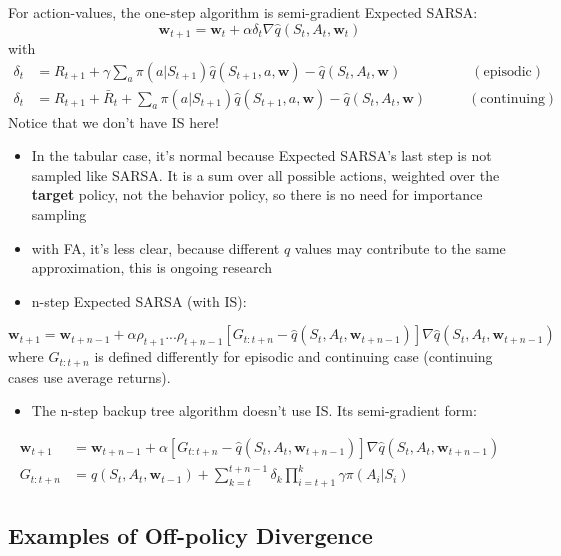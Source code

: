 \documentclass[sutton_barto_notes.tex]{subfiles}
\begin{document}
For action-values, the one-step algorithm is semi-gradient Expected SARSA:
$$ \mathbf{w}_{t+1} = \mathbf{w}_t + \alpha \delta_t \nabla\hat{q}(S_t, A_t, \mathbf{w}_t) $$
with
\begin{align}
\delta_t & = R_{t+1} + \gamma \sum_a \pi(a|S_{t+1}) \hat{q}(S_{t+1}, a, \mathbf{w}) - \hat{q}(S_t, A_t, \mathbf{w}) \quad \quad \quad \quad \quad \mathrm{(episodic)} \label{eq:11.6}\tag{11.6}\\
\delta_t & = R_{t+1} + \bar{R}_t + \sum_a \pi(a|S_{t+1}) \hat{q}(S_{t+1}, a, \mathbf{w}) - \hat{q}(S_t, A_t, \mathbf{w}) \quad \quad \quad \mathrm{(continuing)} \label{eq:11.7}\tag{11.7}
\end{align}
Notice that we don't have IS here!
\begin{itemize}
\item In the tabular case, it's normal because Expected SARSA's last step is not sampled like SARSA. It is a sum over all possible actions, weighted over the \textbf{target} policy, not the behavior policy, so there is no need for importance sampling
\item with FA, it's less clear, because different $q$ values may contribute to the same approximation, this is ongoing research
\item n-step Expected SARSA (with IS):
\end{itemize}
$$ \mathbf{w}_{t+1} = \mathbf{w}_{t+n-1} + \alpha \rho_{t+1} ... \rho_{t+n-1} [G_{t:t+n} - \hat{q}(S_t, A_t, \mathbf{w}_{t+n-1})] \nabla\hat{q}(S_t, A_t, \mathbf{w}_{t+n-1}) $$
where $G_{t:t+n}$ is defined differently for episodic and continuing case (continuing cases use average returns).
\begin{itemize}
\item The n-step backup tree algorithm doesn't use IS. Its semi-gradient form:
\end{itemize}
\begin{align}
\mathbf{w}_{t+1} & = \mathbf{w}_{t+n-1} + \alpha [G_{t:t+n} - \hat{q}(S_t, A_t, \mathbf{w}_{t+n-1})] \nabla\hat{q}(S_t, A_t, \mathbf{w}_{t+n-1}) \label{eq:11.9}\tag{11.9}\\
G_{t:t+n} & = \hat{q}(S_t, A_t, \mathbf{w}_{t-1}) + \sum_{k=t}^{t+n-1} \delta_k \prod_{i=t+1}^k \gamma \pi(A_i|S_i) \label{eq:11.10}\tag{11.10}
\end{align}

\subsection{Examples of Off-policy Divergence}
\end{document}
